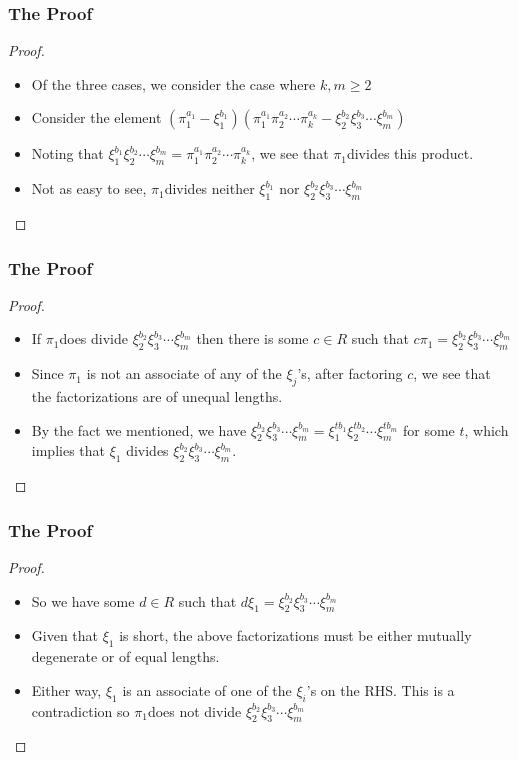 \begin{frame}
  \frametitle{The Proof}
  \begin{proof}
    \begin{itemize}
      \item<1-> Of the three cases, we consider the case where $k,m \geq 2$
      \item<2-> Consider the element $(\pi_{1}^{a_{1}}-\xi_{1}^{b_{1}})(\pi_{1}^{a_{1}}\pi_{2}^{a_{2}}\cdots\pi_{k}^{a_{k}}-\xi_{2}^{b_{2}}\xi_{3}^{b_{3}}\cdots\xi_{m}^{b_{m}})$
      \item<3-> Noting that $\xi_{1}^{b_{1}}\xi_{2}^{b_{2}}\cdots\xi_{m}^{b_{m}}=\pi_{1}^{a_{1}}\pi_{2}^{a_{2}}\cdots\pi_{k}^{a_{k}}$, we see that $\pi_{1}$divides this product. 
      \item<4-> Not as easy to see, $\pi_{1}$divides neither $\xi_{1}^{b_{1}}$ nor $\xi_{2}^{b_{2}}\xi_{3}^{b_{3}}\cdots\xi_{m}^{b_{m}}$
    \end{itemize}
    \noqedsymbol
  \end{proof}
\end{frame}

\begin{frame}
  \frametitle{The Proof}
  \begin{proof}
    \begin{itemize}
      \item<1-> If $\pi_{1}$does divide $\xi_{2}^{b_{2}}\xi_{3}^{b_{3}}\cdots\xi_{m}^{b_{m}}$ then there is some $c\in R$ such that $c\pi_{1}=\xi_{2}^{b_{2}}\xi_{3}^{b_{3}}\cdots\xi_{m}^{b_{m}}$
      \item<2-> Since $\pi_1$ is not an associate of any of the $\xi_j$'s, after factoring $c$, we see that the factorizations are of unequal lengths.
      \item<3-> By the fact we mentioned, we have $\xi_{2}^{b_{2}}\xi_{3}^{b_{3}}\cdots\xi_{m}^{b_{m}}=\xi_{1}^{tb_{1}}\xi_{2}^{tb_{2}}\cdots\xi_{m}^{tb_{m}}$ for some $t$, which implies that $\xi_{1}$ divides $\xi_{2}^{b_{2}}\xi_{3}^{b_{3}}\cdots\xi_{m}^{b_{m}}$.
    \end{itemize}
    \noqedsymbol
  \end{proof}
\end{frame}

\begin{frame}
  \frametitle{The Proof}
  \begin{proof}
    \begin{itemize}
      \item<1-> So we have some $d\in R$ such that $d\xi_{1}=\xi_{2}^{b_{2}}\xi_{3}^{b_{3}}\cdots\xi_{m}^{b_{m}}$
      \item<2-> Given that $\xi_{1}$ is short, the above factorizations must be either mutually degenerate or of equal lengths.
      \item<3-> Either way, $\xi_{1}$ is an associate of one of the $\xi_{i}$'s on the RHS. This is a contradiction so $\pi_{1}$does not divide $\xi_{2}^{b_{2}}\xi_{3}^{b_{3}}\cdots\xi_{m}^{b_{m}}$
    \end{itemize}
    \noqedsymbol
  \end{proof}
\end{frame}

